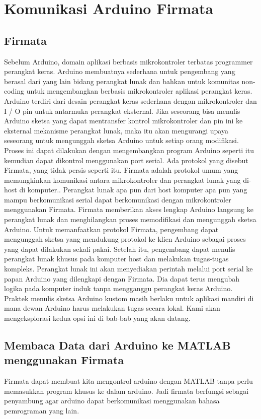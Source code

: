 \section{Komunikasi Arduino Firmata}
\subsection{Firmata}
	Sebelum Arduino, domain aplikasi berbasis mikrokontroler terbatas programmer perangkat keras. Arduino membuatnya sederhana untuk pengembang yang berasal dari yang lain bidang perangkat lunak dan bahkan untuk komunitas non-coding untuk mengembangkan berbasis mikrokontroler aplikasi perangkat keras. 
	Arduino terdiri dari desain perangkat keras sederhana dengan mikrokontroler dan I / O pin untuk antarmuka perangkat eksternal. Jika seseorang bisa menulis Arduino sketsa yang dapat mentransfer kontrol mikrokontroler dan pin ini ke eksternal mekanisme perangkat lunak, maka itu akan mengurangi upaya seseorang untuk mengunggah sketsa Arduino untuk setiap orang modifikasi. 
	Proses ini dapat dilakukan dengan mengembangkan program Arduino seperti itu kemudian dapat dikontrol menggunakan port serial. Ada protokol yang disebut Firmata, yang tidak persis seperti itu.
	Firmata adalah protokol umum yang memungkinkan komunikasi antara mikrokontroler dan perangkat lunak yang di-host di komputer..
	Perangkat lunak apa pun dari host komputer apa pun yang mampu berkomunikasi serial dapat berkomunikasi dengan mikrokontroler menggunakan Firmata. 
	Firmata memberikan akses lengkap Arduino langsung ke perangkat lunak dan menghilangkan proses memodifikasi dan mengunggah sketsa Arduino. 
	Untuk memanfaatkan protokol Firmata, pengembang dapat mengunggah sketsa yang mendukung protokol ke klien Arduino sebagai proses yang dapat dilakukan sekali pakai. 
	Setelah itu, pengembang dapat menulis perangkat lunak khusus pada komputer host dan melakukan tugas-tugas kompleks. Perangkat lunak ini akan menyediakan perintah melalui port serial ke papan Arduino yang dilengkapi dengan Firmata. Dia dapat terus mengubah logika pada komputer induk tanpa mengganggu perangkat keras Arduino. 
	Praktek menulis sketsa Arduino kustom masih berlaku untuk aplikasi mandiri di mana dewan Arduino harus melakukan tugas secara lokal. Kami akan mengeksplorasi kedua opsi ini di bab-bab yang akan datang.

\subsection{Membaca Data dari Arduino ke MATLAB menggunakan Firmata}
	Firmata dapat membuat kita mengontrol arduino dengan MATLAB tanpa perlu memasukkan program khusus ke dalam arduino. Jadi firmata berfungsi sebagai penyambung agar arduino dapat berkomunikasi menggunakan bahasa pemrograman yang lain.
	
